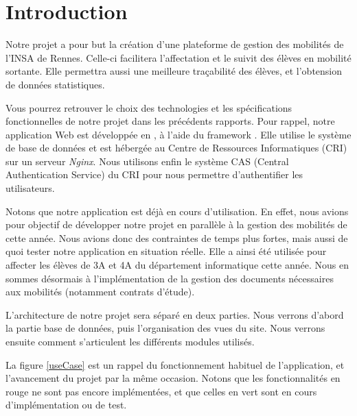\chapter{Introduction}

Notre projet a pour but la création d'une plateforme de gestion des mobilités de l'INSA de Rennes. Celle-ci facilitera l'affectation et le suivit des élèves en mobilité sortante. Elle permettra aussi une meilleure traçabilité des élèves, et l'obtension de données statistiques.

Vous pourrez retrouver le choix des technologies et les spécifications fonctionnelles de notre projet dans les précédents rapports. Pour rappel, notre application Web est développée en \php, à l'aide du framework \symfony. Elle utilise le système de base de données \mdb et est hébergée au Centre de Ressources Informatiques (CRI) sur un serveur \textit{Nginx}. Nous utilisons enfin le système CAS (Central Authentication Service) du CRI pour nous permettre d'authentifier les utilisateurs.

\bigbreak

Notons que notre application est déjà en cours d'utilisation. En effet, nous avions pour objectif de développer notre projet en parallèle à la gestion des mobilités de cette année. Nous avions donc des contraintes de temps plus fortes, mais aussi de quoi tester notre application en situation réelle. Elle a ainsi été utilisée pour affecter les élèves de 3A et 4A du département informatique cette année. Nous en sommes désormais à l'implémentation de la gestion des documents nécessaires aux mobilités (notamment contrats d'étude).

\bigbreak

L'architecture de notre projet sera séparé en deux parties. Nous verrons d'abord la partie base de données, puis l'organisation des vues du site. Nous verrons ensuite comment s'articulent les différents modules utilisés.

\bigbreak
La figure \ref{useCase} est un rappel du fonctionnement habituel de l'application, et l'avancement du projet par la même occasion. Notons que les fonctionnalités en rouge ne sont pas encore implémentées, et que celles en vert sont en cours d'implémentation ou de test. 

